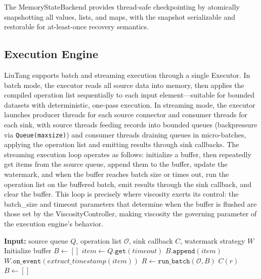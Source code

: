 \documentclass[conference]{IEEEtran}
\begin{document}
The MemoryStateBackend provides thread-safe checkpointing by atomically snapshotting all values, lists, and maps, with the snapshot serializable and restorable for at-least-once recovery semantics.

\subsection{Execution Engine}

LiuTang supports batch and streaming execution through a single Executor. In batch mode, the executor reads all source data into memory, then applies the compiled operation list sequentially to each input element---suitable for bounded datasets with deterministic, one-pass execution. In streaming mode, the executor launches producer threads for each source connector and consumer threads for each sink, with source threads feeding records into bounded queues (backpressure via \texttt{Queue(maxsize)}) and consumer threads draining queues in micro-batches, applying the operation list and emitting results through sink callbacks. The streaming execution loop operates as follows: initialize a buffer, then repeatedly get items from the source queue, append them to the buffer, update the watermark, and when the buffer reaches batch size or times out, run the operation list on the buffered batch, emit results through the sink callback, and clear the buffer. This loop is precisely where viscosity exerts its control: the batch\_size and timeout parameters that determine when the buffer is flushed are those set by the ViscosityController, making viscosity the governing parameter of the execution engine's behavior.

\begin{algorithm}[t]
\caption{Streaming Execution Loop}
\begin{algorithmic}[1]
\STATE \textbf{Input:} source queue $Q$, operation list $\mathcal{O}$, sink callback $C$, watermark strategy $W$
\STATE Initialize buffer $B \gets []$
  \STATE $item \gets Q.\texttt{get}(timeout)$
    \STATE $B.\texttt{append}(item)$
    \STATE $W.\texttt{on\_event}(extract\_timestamp(item))$
  \ENDIF
    \STATE $R \gets \texttt{run\_batch}(\mathcal{O}, B)$
      \STATE $C(r)$
    \ENDFOR
    \STATE $B \gets []$
  \ENDIF
\ENDWHILE
\end{algorithmic}
\end{algorithm}
\end{document}
